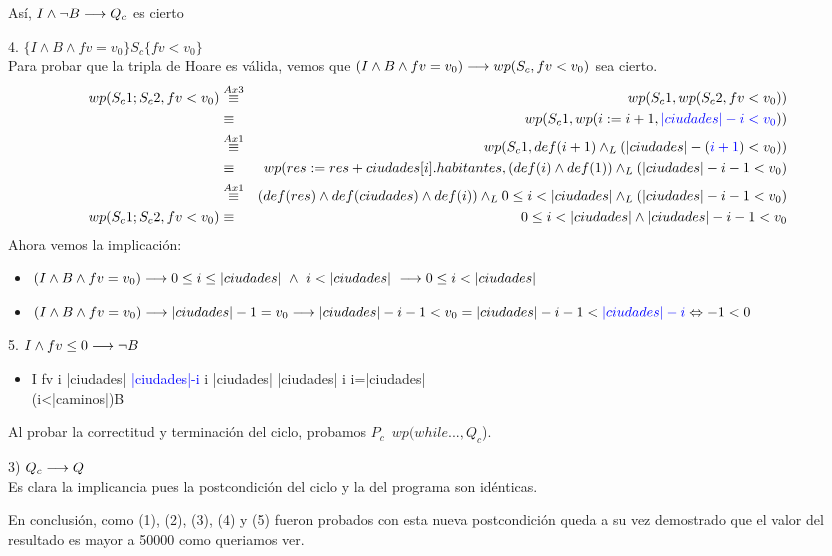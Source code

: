 \documentclass[10pt,a4paper,fleqn]{article}
\begin{document}
Así, $I \land \neg B \longrightarrow Q_c$ es cierto\\
\item 4. $\{I \land B \land fv=v_0\}S_c\{fv<v_0\}$\\Para probar que la tripla de Hoare es válida, vemos que $(I \land B \land fv=v_0) \longrightarrow wp(S_c,fv<v_0)$ sea cierto.\\
\begin{eqnarray}
    wp(S_c1;S_c2, fv<v_0) &\overset{Ax3}{\equiv}& wp(S_c1, wp(S_c2, fv<v_0)) \notag \\
     &\equiv&  wp(S_c1, wp(i:= i+1, \textcolor{blue}{|ciudades|-i < v_0}))\notag \\
    &\overset{Ax1}{\equiv}& wp(S_c1, def(i+1) \land _L (|ciudades|- (\textcolor{blue}{i+1}) < v_0)) \notag \\
    &\equiv& wp(res:= res + ciudades[i].habitantes, (def(i) \land def(1)) \land _L (|ciudades| -i - 1 < v_0)\notag \\
    &\overset{Ax1}{\equiv}& (def(res) \land def(ciudades) \land def(i))\land _L 0 \leq i < |ciudades| \land _L (|ciudades| -i -1 < v_0) \notag \\
    wp(S_c1;S_c2, fv<v_0) &\equiv& 0 \leq i < |ciudades| \land |ciudades| -i -1 < v_0 \notag 
\end{eqnarray}
Ahora vemos la implicación: \\
\begin{itemize}
    \item \parbox[t]{\textwidth}{$(I \land B \land fv=v_0) \longrightarrow 0 \leq i \leq |ciudades| \ \land \ i < |ciudades|\ \longrightarrow 0 \leq i < |ciudades| $}
    \item \parbox[t]{\textwidth}{$(I \land B \land fv=v_0) \longrightarrow |ciudades|-1=v_0 \longrightarrow |ciudades| -i -1 < v_0 = |ciudades| -i -1 < \textcolor{blue}{|ciudades| -i} \Leftrightarrow -1<0$}
\end{itemize}
\item 5. $I \land fv\leq 0 \longrightarrow \neg B$
\begin{itemize}
    \item \parbox[t]{\textwidth}{I \land fv \leq i \leq |ciudades| \land \textcolor{blue}{|ciudades|-i}  \leq i \leq|ciudades| \land |ciudades| \leq i \implica i=|ciudades|\\ \implica \neg(i<|caminos|)\equiv\neg B}
\end{itemize}

Al probar la correctitud y terminación del ciclo, probamos $P_c$\implica \ $wp(while...,Q_c$).\\
\item 3) $Q_c \longrightarrow Q$\\
Es clara la implicancia pues la postcondición del ciclo y la del programa son idénticas.

\noindent En conclusión, como (1), (2), (3), (4) y (5) fueron probados con esta nueva postcondición queda a su vez demostrado que el valor del resultado es mayor a 50000 como queriamos ver.
\end{document}
